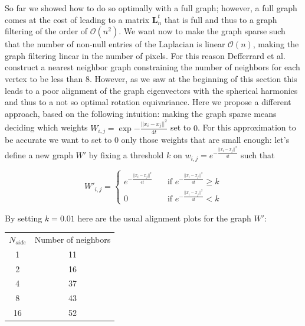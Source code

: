 So far we showed how to do so optimally with a full graph; however, a full graph comes at the cost of leading to a matrix $\mathbf L_n^t$ that is full and thus to a graph filtering of the order of $\mathcal O(n^2)$. We want now to make the graph sparse such that the number of non-null entries of the Laplacian is linear $\mathcal O (n)$, making the graph filtering linear in the number of pixels. For this reason Defferrard et al. construct a nearest neighbor graph constraining the number of neighbors for each vertex to be less than 8. However, as we saw at the beginning of this section this leads to a poor alignment of the graph eigenvectors with the spherical harmonics and thus to a not so optimal rotation equivariance. Here we propose a different approach, based on the following intuition: making the graph sparse means deciding which weights $W_{i,j}=\exp{-\frac{||x_i-x_j||^2}{4t}}$ set to $0$. For this approximation to be accurate we want to set to 0 only those weights that are small enough: let's define a new graph $W'$ by fixing a threshold $k$ on $w_{i,j}=e^{-\frac{||x_i-x_j||^2}{4t}}$ such that

$$W'_{i,j} = \begin{cases}
e^{-\frac{||x_i-x_j||^2}{4t}}\quad& \text{if } e^{-\frac{||x_i-x_j||^2}{4t}} \geq k\\
0 \quad & \text{if } e^{-\frac{||x_i-x_j||^2}{4t}} < k
\end{cases}$$

By setting $k = 0.01$ here are the usual alignment plots for the graph $W'$:

\begin{center}
	\begin{tabular}{ c|c} 
		
		$N_{side}$ & Number of neighbors \\ 
		
		1 & 11 \\ 
		2 & 16 \\ 
		4 & 37 \\ 
		8 & 43 \\ 
		16 & 52 \\ 
		
	\end{tabular}
\end{center}

